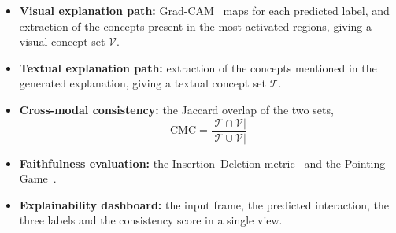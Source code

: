 \begin{itemize}
\item \textbf{Visual explanation path:} Grad-CAM~\cite{selvaraju2017gradcam} maps for each predicted label, and extraction of the concepts present in the most activated regions, giving a visual concept set $\mathcal{V}$.
\item \textbf{Textual explanation path:} extraction of the concepts mentioned in the generated explanation, giving a textual concept set $\mathcal{T}$.
\item \textbf{Cross-modal consistency:} the Jaccard overlap of the two sets,
  \begin{equation}
    \mathrm{CMC} = \frac{|\mathcal{T} \cap \mathcal{V}|}{|\mathcal{T} \cup \mathcal{V}|}
    \label{eq:cmc}
  \end{equation}
\item \textbf{Faithfulness evaluation:} the Insertion--Deletion metric~\cite{petsiuk2018rise} and the Pointing Game~\cite{zhang2018excitation}.
\item \textbf{Explainability dashboard:} the input frame, the predicted interaction, the three labels and the consistency score in a single view.
\end{itemize}
